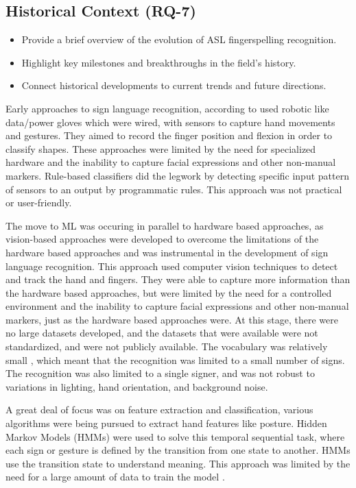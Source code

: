 \subsection{Historical Context (RQ-7)} %

\begin{itemize}
    \item Provide a brief overview of the evolution of ASL fingerspelling recognition.
    \item Highlight key milestones and breakthroughs in the field's history.
    \item Connect historical developments to current trends and future directions.
\end{itemize}

Early approaches to sign language recognition, according to \cite{saeedSystematicReviewSystemsBased2022} used robotic like data/power gloves which were wired, with sensors to capture hand movements and gestures. They aimed to record the finger position and flexion in order to classify shapes. These approaches were limited by the need for specialized hardware and the inability to capture facial expressions and other non-manual markers. Rule-based classifiers did the legwork by detecting specific input pattern of sensors to an output by programmatic rules. This approach was not practical or user-friendly.

The move to ML was occuring in parallel to hardware based approaches, as vision-based approaches were developed to overcome the limitations of the hardware based approaches and was instrumental in the development of sign language recognition. This approach used computer vision techniques to detect and track the hand and fingers. They were able to capture more information than the hardware based approaches, but were limited by the need for a controlled environment and the inability to capture facial expressions and other non-manual markers, just as the hardware based approaches were. At this stage, there were no large datasets developed, and the datasets that were available were not standardized, and were not publicly available. The vocabulary was relatively small \cite{vonagrisRecentDevelopmentsVisual2008}, which meant that the recognition was limited to a small number of signs. The recognition was also limited to a single signer, and was not robust to variations in lighting, hand orientation, and background noise.

A great deal of focus was on feature extraction and classification, various algorithms were being pursued to extract hand features like posture. Hidden Markov Models (HMMs) were used to solve this temporal sequential task, where each sign or gesture is defined by the transition from one state to another. HMMs use the transition state to understand meaning. This approach was limited by the need for a large amount of data to train the model \cite{vonagrisRecentDevelopmentsVisual2008}.

